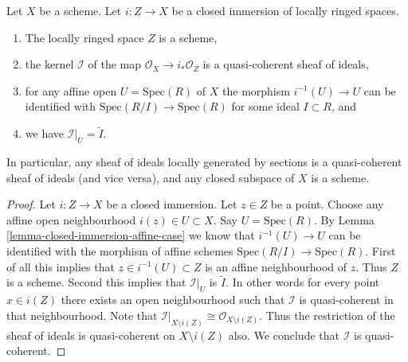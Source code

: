 \begin{lemma}
\label{lemma-closed-subspace-scheme}
Let $X$ be a scheme. Let $i : Z \to X$ be a closed immersion
of locally ringed spaces.
\begin{enumerate}
\item The locally ringed space $Z$ is a scheme,
\item the kernel $\mathcal{I}$ of the map
$\mathcal{O}_X \to i_*\mathcal{O}_Z$ is a quasi-coherent
sheaf of ideals,
\item for any affine open $U = \text{Spec}(R)$ of $X$
the morphism $i^{-1}(U) \to U$ can be identified with
$\text{Spec}(R/I) \to \text{Spec}(R)$ for some ideal $I \subset R$, and
\item we have $\mathcal{I}|_U = \widetilde I$.
\end{enumerate}
In particular, any sheaf of ideals locally generated by sections
is a quasi-coherent sheaf of ideals (and vice versa),
and any closed subspace of $X$ is a scheme.
\end{lemma}

\begin{proof}
Let $i : Z \to X$ be a closed immersion.
Let $z \in Z$ be a point. Choose any affine open
neighbourhood $i(z) \in U \subset X$. Say $U = \text{Spec}(R)$.
By Lemma \ref{lemma-closed-immersion-affine-case} we know
that $i^{-1}(U) \to U$ can be identified with the morphism
of affine schemes $\text{Spec}(R/I) \to \text{Spec}(R)$.
First of all this implies that $z \in i^{-1}(U) \subset Z$ is an
affine neighbourhood of $z$. Thus $Z$ is a scheme. Second
this implies that $\mathcal{I}|_U$ is $\widetilde I$.
In other words for every point $x \in i(Z)$ there exists an
open neighbourhood such that $\mathcal{I}$ is quasi-coherent in
that neighbourhood. Note that $\mathcal{I}|_{X \setminus i(Z)}
\cong \mathcal{O}_{X \setminus i(Z)}$. Thus the restriction
of the sheaf of ideals is quasi-coherent on $X \setminus i(Z)$
also. We conclude that $\mathcal{I}$ is quasi-coherent.
\end{proof}

